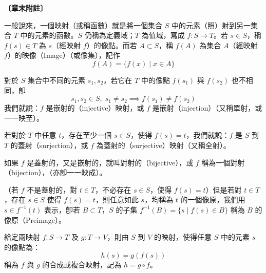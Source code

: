\vspace{1.5em}
\noindent\textbf{〔章末附註〕}\label{note:b4s-ch1-p57-appendix-note}

一般說來，一個映射（或稱函數）就是將一個集合 $S$ 中的元素（照）射到另一集合 $T$ 中的元素的函數。$S$ 仍稱為定義域；$T$ 為值域，寫成 $f: S \to T$。若 $s \in S$，稱 $f(s) \in T$ 為 $s$（經映射 $f$）的像點。而若 $A \subset S$，稱 $f(A)$ 為集合 $A$（經映射 $f$）的映像（Image）（或像集），記作
\[ f(A) = \{f(x) \mid x \in A\} \]

對於 $S$ 集合中不同的元素 $s_1, s_2$，若它在 $T$ 中的像點 $f(s_1)$ 與 $f(s_2)$ 也不相同，卽
\[ s_1, s_2 \in S, \; s_1 \neq s_2 \implies f(s_1) \neq f(s_2) \]
我們就說：$f$ 是嵌射的（injective）映射，或 $f$ 是嵌射（injection）（又稱單射，或一一映至）。

若對於 $T$ 中任意 $t$，存在至少一個 $s \in S$，使得 $f(s) = t$，我們就說：$f$ 是 $S$ 到 $T$ 的蓋射（surjection），或 $f$ 為蓋射的（surjective）映射（又稱全射）。

如果 $f$ 是蓋射的，又是嵌射的，就叫對射的（bijective），或 $f$ 稱為一個對射（bijection），（亦卽一一映成）。

（若 $f$ 不是蓋射的，對 $t \in T$，不必存在 $s \in S$，使得 $f(s) = t$）但是若對 $t \in T$，存在 $s \in S$ 使得 $f(s) = t$，則任意如此 $s$，均稱為 $t$ 的一個像原，我們用 $s \in f^{-1}(t)$ 表示，卽若 $B \subset T$，$S$ 的子集 $f^{-1}(B) = \{s \mid f(s) \in B\}$ 稱為 $B$ 的像原（Preimage）。

給定兩映射 $f: S \to T$ 及 $g: T \to V$，則由 $S$ 到 $V$ 的映射，使得任意 $S$ 中的元素 $s$ 的像點為：
\[ h(s) = g(f(s)) \]
稱為 $f$ 與 $g$ 的合成或複合映射，記為 $h = g \circ f$。
